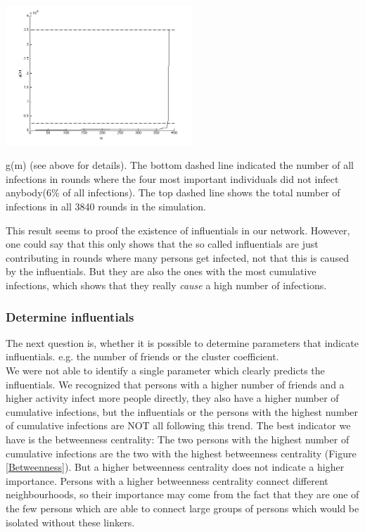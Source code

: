 \begin{minipage}{0.5\textwidth}
\includegraphics[width=7cm]{influ3}
\end{minipage}
\begin{minipage}{0.5\textwidth}
\caption{ g(m) (see above for details). The bottom dashed line indicated the number of all infections in rounds where the four most important individuals did not infect anybody(6\% of all infections). The top dashed line shows the total number of infections in all 3840 rounds in the simulation.}
\label{importancedist}
\end{minipage}

\noindent This result seems to proof the existence of influentials in our network. However, one could say that this only shows that the so called influentials are just contributing in rounds where many persons get infected, not that this is caused by the influentials. But they are also the ones with the most cumulative infections, which shows that they really \textit{cause} a high number of infections.


\subsubsection{Determine influentials}


The next question is, whether it is possible to determine parameters that indicate influentials. e.g. the number of friends or the cluster coefficient.
\\
We were not able to identify a single parameter which clearly predicts the influentials. We recognized that persons with a higher number of friends and a higher activity infect more people directly, they also have a higher number of cumulative infections, but the influentials or the persons with the highest number of cumulative infections are  NOT all following this trend. The best indicator we have is the betweenness centrality: The two persons with the highest number of cumulative infections are the two with the highest betweenness centrality (Figure \ref{Betweenness}). But a higher betweenness centrality does not indicate a higher importance. Persons with a higher betweenness centrality connect different neighbourhoods, so their importance may come from the fact that they are one of the few persons which are able to connect large groups of persons which would be isolated without these linkers.

